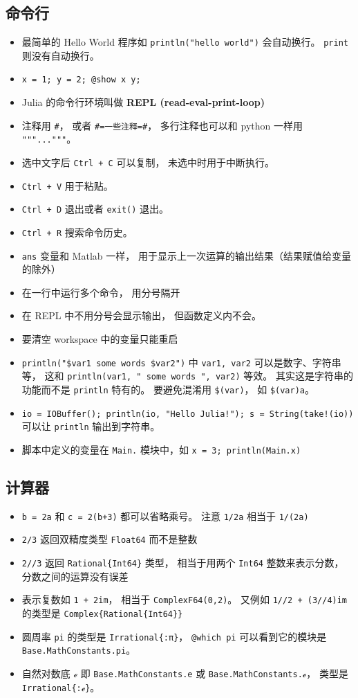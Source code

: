 \subsection{命令行}
\begin{itemize}
\item 最简单的 Hello World 程序如 \verb`println("hello world")` 会自动换行。 \verb`print` 则没有自动换行。
\item \verb`x = 1; y = 2; @show x y;`
\item Julia 的命令行环境叫做 \textbf{REPL (read-eval-print-loop)}
\item 注释用 \verb`#`， 或者 \verb`#=一些注释=#`， 多行注释也可以和 python 一样用 \verb`"""..."""`。
\item 选中文字后 \verb`Ctrl + C` 可以复制， 未选中时用于中断执行。
\item \verb`Ctrl + V` 用于粘贴。
\item \verb`Ctrl + D` 退出或者 \verb`exit()` 退出。
\item \verb`Ctrl + R` 搜索命令历史。
\item \verb`ans` 变量和 Matlab 一样， 用于显示上一次运算的输出结果（结果赋值给变量的除外）
\item 在一行中运行多个命令， 用分号隔开
\item 在 REPL 中不用分号会显示输出， 但函数定义内不会。
\item 要清空 workspace 中的变量只能重启
\item \verb`println("$var1 some words $var2")` 中 \verb`var1, var2` 可以是数字、字符串等， 这和 \verb`println(var1, " some words ", var2)` 等效。 其实这是字符串的功能而不是 \verb`println` 特有的。 要避免混淆用 \verb`$(var)`， 如 \verb`$(var)a`。
\item \verb`io = IOBuffer(); println(io, "Hello Julia!"); s = String(take!(io))` 可以让 \verb`println` 输出到字符串。
\item 脚本中定义的变量在 \verb`Main.` 模块中，如 \verb`x = 3; println(Main.x)`
\end{itemize}

\subsection{计算器}
\begin{itemize}
\item \verb`b = 2a` 和 \verb`c = 2(b+3)` 都可以省略乘号。 注意 \verb`1/2a` 相当于 \verb`1/(2a)`
\item \verb`2/3` 返回双精度类型 \verb`Float64` 而不是整数
\item \verb`2//3` 返回 \verb`Rational{Int64}` 类型， 相当于用两个 \verb`Int64` 整数来表示分数， 分数之间的运算没有误差
\item 表示复数如 \verb`1 + 2im`， 相当于 \verb`ComplexF64(0,2)`。 又例如 \verb`1//2 + (3//4)im` 的类型是 \verb`Complex{Rational{Int64}}`
\item 圆周率 \verb`pi` 的类型是 \verb`Irrational{:π}`， \verb`@which pi` 可以看到它的模块是 \verb`Base.MathConstants.pi`。
\item 自然对数底 \verb`ℯ` 即 \verb`Base.MathConstants.e` 或 \verb`Base.MathConstants.ℯ`， 类型是 \verb`Irrational{:ℯ}`。
\end{itemize}

